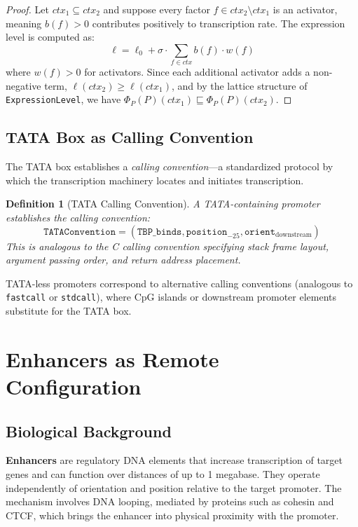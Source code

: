 \documentclass[12pt,a4paper]{article}
\newtheorem{definition}[theorem]{Definition}
\newcommand{\ExprLevel}{\texttt{ExpressionLevel}}
\begin{document}
\begin{proof}
Let $ctx_1 \subseteq ctx_2$ and suppose every factor $f \in ctx_2 \setminus ctx_1$ is an activator, meaning $b(f) > 0$ contributes positively to transcription rate.  The expression level is computed as:
\[
\ell = \ell_0 + \sigma \cdot \sum_{f \in ctx} b(f) \cdot w(f)
\]
where $w(f) > 0$ for activators.  Since each additional activator adds a non-negative term, $\ell(ctx_2) \geq \ell(ctx_1)$, and by the lattice structure of \ExprLevel, we have $\Phi_P(P)(ctx_1) \sqsubseteq \Phi_P(P)(ctx_2)$.
\end{proof}

\subsection{TATA Box as Calling Convention}

The TATA box establishes a \emph{calling convention}---a standardized protocol by which the transcription machinery locates and initiates transcription.

\begin{definition}[TATA Calling Convention]\label{def:tata-calling}
A TATA-containing promoter establishes the calling convention:
\[
\texttt{TATAConvention} = (\texttt{TBP\_binds}, \texttt{position}_{-25}, \texttt{orient}_{\text{downstream}})
\]
This is analogous to the C calling convention specifying stack frame layout, argument passing order, and return address placement.
\end{definition}

TATA-less promoters correspond to alternative calling conventions (analogous to \texttt{fastcall} or \texttt{stdcall}), where CpG islands or downstream promoter elements substitute for the TATA box.


\section{Enhancers as Remote Configuration}\label{sec:enhancers}

\subsection{Biological Background}

\textbf{Enhancers} are regulatory DNA elements that increase transcription of target genes and can function over distances of up to 1 megabase.  They operate independently of orientation and position relative to the target promoter.  The mechanism involves DNA looping, mediated by proteins such as cohesin and CTCF, which brings the enhancer into physical proximity with the promoter.
\end{document}
